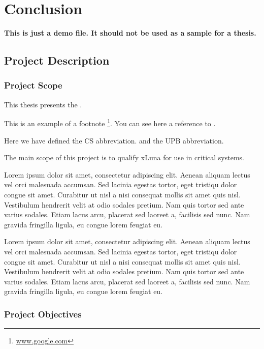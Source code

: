\chapter{Conclusion}
\label{chapter:intro}

\textbf{This is just a demo file. It should not be used as a sample for a thesis.}\\

\section{Project Description}
\label{sec:proj}

\subsection{Project Scope}
\label{sub-sec:proj-scope}

This thesis presents the \textbf{\project}.

This is an example of a footnote \footnote{\url{www.google.com}}. You can see here a reference to .

Here we have defined the CS abbreviation. and the UPB abbreviation.

The main scope of this project is to qualify xLuna for use in critical systems.


Lorem ipsum dolor sit amet, consectetur adipiscing elit. Aenean aliquam lectus vel orci malesuada accumsan. Sed lacinia egestas tortor, eget tristiqu dolor congue sit amet. Curabitur ut nisl a nisi consequat mollis sit amet quis nisl. Vestibulum hendrerit velit at odio sodales pretium. Nam quis tortor sed ante varius sodales. Etiam lacus arcu, placerat sed laoreet a, facilisis sed nunc. Nam gravida fringilla ligula, eu congue lorem feugiat eu.

Lorem ipsum dolor sit amet, consectetur adipiscing elit. Aenean aliquam lectus vel orci malesuada accumsan. Sed lacinia egestas tortor, eget tristiqu dolor congue sit amet. Curabitur ut nisl a nisi consequat mollis sit amet quis nisl. Vestibulum hendrerit velit at odio sodales pretium. Nam quis tortor sed ante varius sodales. Etiam lacus arcu, placerat sed laoreet a, facilisis sed nunc. Nam gravida fringilla ligula, eu congue lorem feugiat eu.


\subsection{Project Objectives}
\label{sub-sec:proj-objectives}

